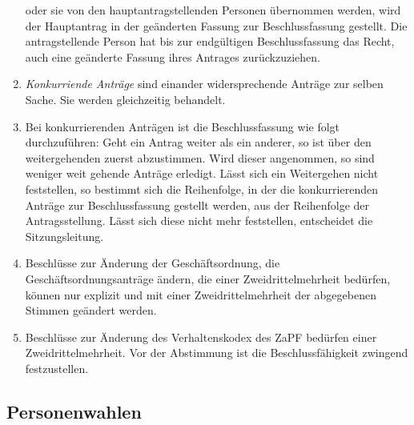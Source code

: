 \documentclass[
  a4paper,
  oneside]{scrartcl}
\begin{document}
\begin{enumerate}
  oder sie von den hauptantragstellenden Personen übernommen werden,
  wird der Hauptantrag in der geänderten Fassung zur Beschlussfassung
  gestellt. Die antragstellende Person hat bis zur endgültigen
  Beschlussfassung das Recht, auch eine geänderte Fassung ihres Antrages
  zurückzuziehen.
\item
  \emph{Konkurriende Anträge} sind einander widersprechende Anträge zur
  selben Sache. Sie werden gleichzeitig behandelt.
\item
  Bei konkurrierenden Anträgen ist die Beschlussfassung wie folgt
  durchzuführen: Geht ein Antrag weiter als ein anderer, so ist über den
  weitergehenden zuerst abzustimmen. Wird dieser angenommen, so sind
  weniger weit gehende Anträge erledigt. Lässt sich ein Weitergehen
  nicht feststellen, so bestimmt sich die Reihenfolge, in der die
  konkurrierenden Anträge zur Beschlussfassung gestellt werden, aus der
  Reihenfolge der Antragsstellung. Lässt sich diese nicht mehr
  feststellen, entscheidet die Sitzungsleitung.
\item
  Beschlüsse zur Änderung der Geschäftsordnung, die
  Geschäftsordnungsanträge ändern, die einer Zweidrittelmehrheit
  bedürfen, können nur explizit und mit einer Zweidrittelmehrheit der
  abgegebenen Stimmen geändert werden.
\item
  Beschlüsse zur Änderung des Verhaltenskodex des ZaPF bedürfen einer
  Zweidrittelmehrheit. Vor der Abstimmung ist die Beschlussfähigkeit
  zwingend festzustellen.
\end{enumerate}

\hypertarget{personenwahlen}{%
\subsection{Personenwahlen}\label{personenwahlen}}
\end{document}
